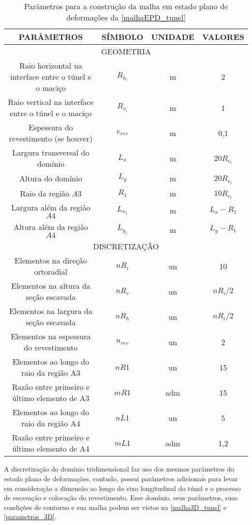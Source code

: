 \begin{table}[H]
	\caption{Parâmetros para a construção da malha em estado plano de deformações da \autoref{malhaEPD_tunel}}
	\label{parametros_EPD}
	\centering
	\small
	\renewcommand{\arraystretch}{1.25}
	\begin{tabular}{c c c c}
		\hline
		\multicolumn{1}{c}{\textbf{PARÂMETROS}} &
		\multicolumn{1}{c}{\textbf{SÍMBOLO}} &
		\multicolumn{1}{c}{\textbf{UNIDADE}} &
		\multicolumn{1}{c}{\textbf{VALORES}} \\
		\hline
		\multicolumn{4}{c}{GEOMETRIA} \\
		\hline
		Raio horizontal na interface entre o túnel e o maciço & $R_{h_i}$ & m & 2 \\
		Raio vertical na interface entre o túnel e o maciço & $R_{v_i}$ & m & 1 \\
		Espessura do revestimento (se houver) & $e_{rev}$ & m & 0,1 \\
		Largura transversal do domínio & $L_x$ & m & 20$R_{v_i}$ \\
		Altura do domínio & $L_y$ & m & 20$R_{v_i}$ \\
		Raio da região $A3$ & $R_1$ & m & 10$R_{v_i}$ \\
		Largura além da região $A4$ & $L_{x_1}$ & m & $L_x-R_1$ \\
		Altura além da região $A4$ & $L_{y_1}$ & m & $L_y-R_1$ \\
		\hline
		\multicolumn{4}{c}{DISCRETIZAÇÃO} \\
		\hline
		Elementos na direção ortoradial & $nR_i$ & un & 10 \\
		Elementos na altura da seção escavada & $nR_{v}$ & un & $nR_i/2$ \\
		Elementos na largura da seção escavada & $nR_{h}$ & un & $nR_i/2$ \\
		Elementos na espessura do revestimento & $n_{rev}$ & un & 2 \\
		Elementos ao longo do raio da região A3 & $nR{1}$ & un & 15 \\
		Razão entre primeiro e último elemento de A3 & $mR{1}$ & adm & 15 \\
		Elementos ao longo do raio da região A4 & $nL{1}$ & un & 5 \\
		Razão entre primeiro e último elemento de A4 & $mL{1}$ & adm & 1,2 \\
		\hline
	\end{tabular}
	\normalsize
\end{table}

A discretização do domínio tridimensional faz uso dos mesmos parâmetros do estado plano de deformações, contudo, possui parâmetros adicionais para levar em consideração a dimensão ao longo do eixo longitudinal do túnel e o processo de escavação e colocação do revestimento. Esse domínio, seus parâmetros, suas condições de contorno e sua malha podem ser vistos na \autoref{malha3D_tunel} e \autoref{parametros_3D}.

